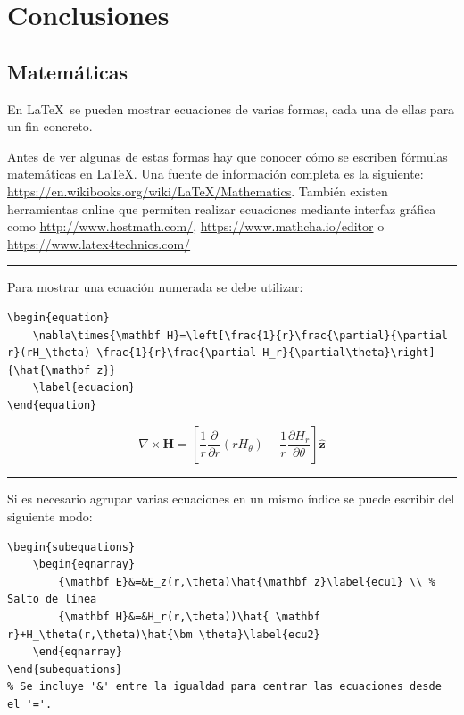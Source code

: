 
\chapter{Conclusiones}
\label{conclusiones}

\section{Matemáticas}

En \LaTeX~se pueden mostrar ecuaciones de varias formas, cada una de ellas para un fin concreto.
\par Antes de ver algunas de estas formas hay que conocer cómo se escriben fórmulas matemáticas en \LaTeX. Una fuente de información completa es la siguiente: \url{https://en.wikibooks.org/wiki/LaTeX/Mathematics}. También existen herramientas online que permiten realizar ecuaciones mediante interfaz gráfica como \url{http://www.hostmath.com/}, \url{https://www.mathcha.io/editor} o \url{https://www.latex4technics.com/}
\vspace{1em}
\noindent\hrule
\vspace{1em}
Para mostrar una ecuación numerada se debe utilizar:
\begin{lstlisting}[style=Latex-color,label=latex_code1]
\begin{equation}
	\nabla\times{\mathbf H}=\left[\frac{1}{r}\frac{\partial}{\partial r}(rH_\theta)-\frac{1}{r}\frac{\partial H_r}{\partial\theta}\right]{\hat{\mathbf z}}
	\label{ecuacion}
\end{equation}
\end{lstlisting}
\begin{equation}
  \nabla\times{\mathbf H}=\left[\frac{1}{r}\frac{\partial}{\partial
        r}(rH_\theta)-\frac{1}{r}\frac{\partial
        H_r}{\partial\theta}\right]{\hat{\mathbf z}}
        \label{ecuacion}
\end{equation}
\vspace{1em}
\noindent\hrule
\vspace{1em}
Si es necesario agrupar varias ecuaciones en un mismo índice se puede escribir del siguiente modo:

\begin{lstlisting}[style=Latex-color,label=latex_code2]
\begin{subequations}
	\begin{eqnarray}
    	{\mathbf E}&=&E_z(r,\theta)\hat{\mathbf z}\label{ecu1} \\ % Salto de línea
    	{\mathbf H}&=&H_r(r,\theta))\hat{ \mathbf r}+H_\theta(r,\theta)\hat{\bm \theta}\label{ecu2}
	\end{eqnarray}
\end{subequations}
% Se incluye '&' entre la igualdad para centrar las ecuaciones desde el '='.
\end{lstlisting}

